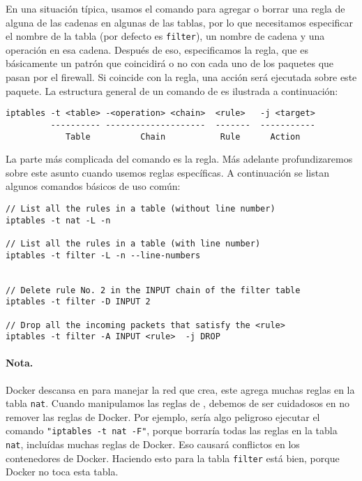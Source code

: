 En una situación típica, usamos el comando \iptables para agregar o borrar una regla de alguna de las cadenas en algunas de las tablas, por lo que necesitamos especificar el nombre de la tabla (por defecto es \texttt{filter}), un nombre de cadena y una operación en esa cadena. Después de eso, especificamos la regla, que es básicamente un patrón que coincidirá o no con cada uno de los paquetes que pasan por el firewall. Si coincide con la regla, una acción será ejecutada sobre este paquete.
La estructura general de un comando de \iptables es ilustrada a continuación:

\begin{lstlisting}
iptables -t <table> -<operation> <chain>  <rule>   -j <target>
         ---------- --------------------  -------  -----------
            Table          Chain           Rule      Action
\end{lstlisting}

La parte más complicada del comando \iptables es la regla.
Más adelante profundizaremos sobre este asunto cuando usemos reglas específicas. A continuación se listan algunos comandos básicos de uso común:


\begin{lstlisting}
// List all the rules in a table (without line number)
iptables -t nat -L -n

// List all the rules in a table (with line number)
iptables -t filter -L -n --line-numbers


// Delete rule No. 2 in the INPUT chain of the filter table 
iptables -t filter -D INPUT 2

// Drop all the incoming packets that satisfy the <rule>
iptables -t filter -A INPUT <rule>  -j DROP
\end{lstlisting}


\paragraph{Nota.} Docker descansa en \iptables para manejar la red que crea, este agrega muchas reglas en la tabla \texttt{nat}.
Cuando manipulamos las reglas de \iptables, debemos de ser cuidadosos en no remover las reglas de Docker. Por ejemplo, sería algo peligroso ejecutar el comando \texttt{"iptables -t nat -F"}, porque borraría todas las reglas en la tabla \texttt{nat}, incluídas muchas reglas de Docker. Eso causará conflictos en los contenedores de Docker. Haciendo esto para la tabla \texttt{filter} está bien, porque Docker no toca esta tabla.


